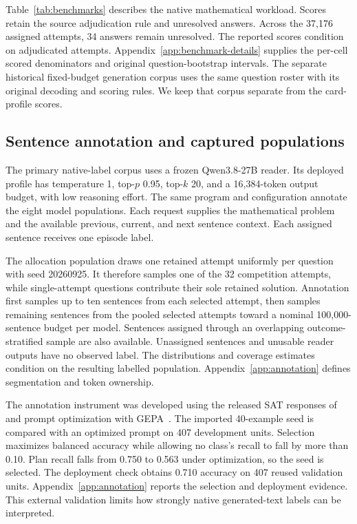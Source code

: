 

Table~\ref{tab:benchmarks} describes the native mathematical workload.
%
Scores retain the source adjudication rule and unresolved answers.
%
Across the 37,176 assigned attempts, 34 answers remain unresolved.
%
The reported scores condition on adjudicated attempts.
%
Appendix~\ref{app:benchmark-details} supplies the per-cell scored denominators and original question-bootstrap intervals.
%
The separate historical fixed-budget generation corpus uses the same question roster with its original decoding and scoring rules.
%
We keep that corpus separate from the card-profile scores.
%

\subsection{Sentence annotation and captured populations}

The primary native-label corpus uses a frozen Qwen3.8-27B reader.
%
Its deployed profile has temperature 1, top-$p$ 0.95, top-$k$ 20, and a 16,384-token output budget, with low reasoning effort.
%
The same program and configuration annotate the eight model populations.
%
Each request supplies the mathematical problem and the available previous, current, and next sentence context.
%
Each assigned sentence receives one episode label.
%

The allocation population draws one retained attempt uniformly per question with seed 20260925.
%
It therefore samples one of the 32 competition attempts, while single-attempt questions contribute their sole retained solution.
%
Annotation first samples up to ten sentences from each selected attempt, then samples remaining sentences from the pooled selected attempts toward a nominal 100,000-sentence budget per model.
%
Sentences assigned through an overlapping outcome-stratified sample are also available.
%
Unassigned sentences and unusable reader outputs have no observed label.
%
The distributions and coverage estimates condition on the resulting labelled population.
%
Appendix~\ref{app:annotation} defines segmentation and token ownership.
%

The annotation instrument was developed using the released SAT responses of \citet{li2025schoenfeld} and prompt optimization with GEPA~\citep{agrawal2026gepa}.
%
The imported 40-example seed is compared with an optimized prompt on 407 development units.
%
Selection maximizes balanced accuracy while allowing no class's recall to fall by more than 0.10.
%
Plan recall falls from 0.750 to 0.563 under optimization, so the seed is selected.
%
The deployment check obtains 0.710 accuracy on 407 reused validation units.
%
Appendix~\ref{app:annotation} reports the selection and deployment evidence.
%
This external validation limits how strongly native generated-text labels can be interpreted.
%

